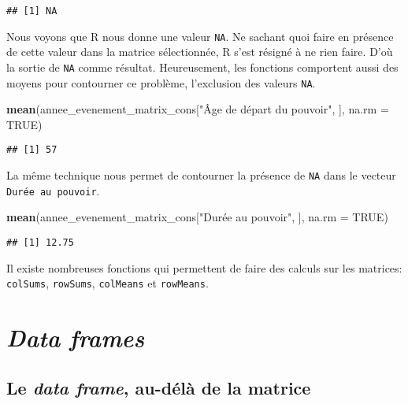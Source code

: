\documentclass[]{book}
\newenvironment{Shaded}{\begin{snugshade}}{\end{snugshade}}
\newcommand{\KeywordTok}[1]{\textcolor[rgb]{0.13,0.29,0.53}{\textbf{#1}}}
\newcommand{\DataTypeTok}[1]{\textcolor[rgb]{0.13,0.29,0.53}{#1}}
\newcommand{\StringTok}[1]{\textcolor[rgb]{0.31,0.60,0.02}{#1}}
\newcommand{\OtherTok}[1]{\textcolor[rgb]{0.56,0.35,0.01}{#1}}
\newcommand{\NormalTok}[1]{#1}
\begin{document}
\begin{verbatim}
## [1] NA
\end{verbatim}

Nous voyons que R nous donne une valeur \texttt{NA}. Ne sachant quoi
faire en présence de cette valeur dans la matrice sélectionnée, R s'est
résigné à ne rien faire. D'où la sortie de \texttt{NA} comme résultat.
Heureusement, les fonctions comportent aussi des moyens pour contourner
ce problème, l'exclusion des valeurs \texttt{NA}.

\begin{Shaded}
\begin{Highlighting}[]
\KeywordTok{mean}\NormalTok{(annee_evenement_matrix_cons[}\StringTok{"Âge de départ du pouvoir"}\NormalTok{, ], }\DataTypeTok{na.rm =} \OtherTok{TRUE}\NormalTok{)}
\end{Highlighting}
\end{Shaded}

\begin{verbatim}
## [1] 57
\end{verbatim}

La même technique nous permet de contourner la présence de \texttt{NA}
dans le vecteur \texttt{Durée\ au\ pouvoir}.

\begin{Shaded}
\begin{Highlighting}[]
\KeywordTok{mean}\NormalTok{(annee_evenement_matrix_cons[}\StringTok{"Durée au pouvoir"}\NormalTok{, ], }\DataTypeTok{na.rm =} \OtherTok{TRUE}\NormalTok{)}
\end{Highlighting}
\end{Shaded}

\begin{verbatim}
## [1] 12.75
\end{verbatim}

Il existe nombreuses fonctions qui permettent de faire des calculs sur
les matrices: \texttt{colSums}, \texttt{rowSums}, \texttt{colMeans} et
\texttt{rowMeans}.

\section{\texorpdfstring{\emph{Data
frames}}{Data frames}}\label{data-frames}

\subsection{\texorpdfstring{Le \emph{data frame}, au-délà de la
matrice}{Le data frame, au-délà de la matrice}}\label{le-data-frame-au-dela-de-la-matrice}
\end{document}
